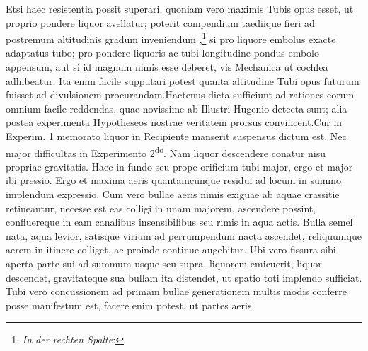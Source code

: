 Etsi haec resistentia possit  superari, quoniam vero  maximis Tubis opus esset, ut proprio pondere  liquor avellatur; poterit compendium   taediique fieri ad postremum altitudinis gradum inveniendum ,\footnote{\textit{In der rechten Spalte}: } si pro liquore embolus\protect{} exacte adaptatus tubo;  pro pondere liquoris ac tubi longitudine pondus embolo\protect{}  appensum, aut si id magnum nimis esse deberet, vis Mechanica\protect{} ut cochlea\protect{} adhibeatur. Ita enim  facile  supputari potest quanta altitudine Tubi opus futurum  fuisset ad divulsionem procurandam.\pend \pstart  Hactenus dicta sufficiunt ad rationes eorum omnium  facile reddendas, quae novissime ab Illustri Hugenio\protect{}  detecta sunt; alia postea experimenta   Hypotheseos nostrae veritatem prorsus convincent.\pend \pstart  Cur in Experim. 1  memorato  liquor  in Recipiente manserit suspensus dictum est.  Nec major difficultas in Experimento 2\textsuperscript{do}. Nam liquor  descendere conatur nisu propriae gravitatis\protect{}. Haec in  fundo seu prope orificium tubi major, ergo et major  ibi pressio. Ergo et maxima aeris  quantamcunque residui ad locum in summo implendum  expressio. Cum vero bullae aeris nimis exiguae  ab aquae crassitie retineantur, necesse  est eas colligi in unam majorem,  ascendere  possint, confluereque in eam canalibus insensibilibus seu  rimis in aqua actis. Bulla semel nata, aqua  levior, satisque virium ad perrumpendum nacta  ascendet, reliquumque aerem in itinere colliget,  ac proinde continue augebitur. Ubi vero fissura  sibi aperta parte sui ad summum usque seu supra,  liquorem emicuerit, liquor descendet, gravitateque\protect{}  sua bullam ita distendet, ut spatio toti implendo  sufficiat. Tubi vero concussionem ad primam  bullae generationem multis modis conferre posse  manifestum est, facere enim potest, ut partes aeris 